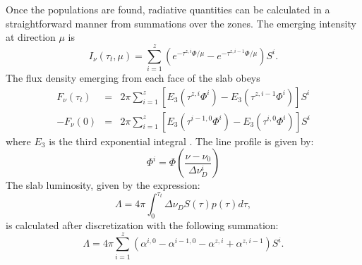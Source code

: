\documentclass[12pt]{article}
\def\non{\nonumber \\}
\def\tot      {\tau_t}
\def\t(#1){\tau^{#1}}
\begin{document}
Once the populations are found, radiative quantities can be calculated in a
straightforward manner from summations over the zones. The emerging intensity
at direction $\mu$ is
\begin{equation}
    I_\nu(\tot,\mu) = \sum_{i = 1}^z
     \left(e^{-\tau^{z,i}\Phi/\mu} -  e^{-\tau^{z,i - 1}\Phi/\mu}\right)S^i.
\end{equation}
The flux density emerging from each face of the slab obeys
\begin{eqnarray}
    F_\nu(\tot) &=& 2\pi\sum_{i = 1}^z
    \left[E_3(\tau^{z,i}\Phi^i) - E_3(\tau^{z,i - 1}\Phi^i)\right] S^i \non
    -F_\nu(0)  &=& 2\pi \sum_{i = 1}^z
    \left[E_3(\t(i - 1,0)\Phi^i) - E_3(\t(i,0)\Phi^i)\right] S^i
\end{eqnarray}
where $E_3$ is the third exponential integral \citep[e.g.,][]{abramowitz72}. The line profile
is given by:
\begin{equation}
\Phi^i = \Phi \left( \frac{\nu-\nu_0}{\Delta \nu_D^i} \right)
\end{equation}
The slab luminosity, given
by the expression:
\begin{equation}
\Lambda = 4 \pi \int_0^{\tot} \Delta \nu_D S(\tau)p(\tau)d\tau,
\end{equation}
is calculated after discretization with the following summation:
\begin{equation}
\Lambda = 4 \pi \sum_{i = 1}^z
 \left(\alpha^{i,0} - \alpha^{i-1,0} - \alpha^{z,i} + \alpha^{z,i-1}\right)S^i.
\end{equation}
\end{document}

